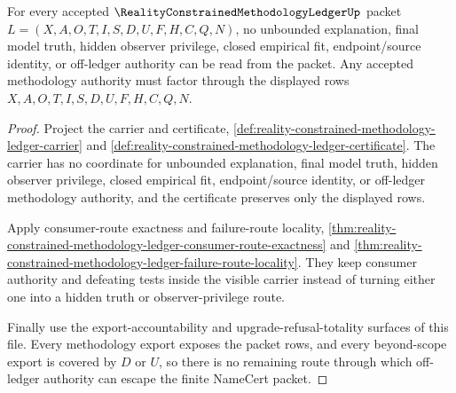 \begin{theorem}
\label{thm:reality-constrained-methodology-ledger-authority-nonescape}
For every accepted $\RealityConstrainedMethodologyLedgerUp$ packet
$L=(X,A,O,T,I,S,D,U,F,H,C,Q,N)$, no unbounded explanation, final model truth,
hidden observer privilege, closed empirical fit, endpoint/source identity, or
off-ledger authority can be read from the packet. Any accepted methodology
authority must factor through the displayed rows
$X,A,O,T,I,S,D,U,F,H,C,Q,N$.
\end{theorem}
\begin{proof}
Project the carrier and certificate,
\autoref{def:reality-constrained-methodology-ledger-carrier} and
\autoref{def:reality-constrained-methodology-ledger-certificate}. The carrier
has no coordinate for unbounded explanation, final model truth, hidden observer
privilege, closed empirical fit, endpoint/source identity, or off-ledger
methodology authority, and the certificate preserves only the displayed rows.

Apply consumer-route exactness and failure-route locality,
\autoref{thm:reality-constrained-methodology-ledger-consumer-route-exactness}
and
\autoref{thm:reality-constrained-methodology-ledger-failure-route-locality}.
They keep consumer authority and defeating tests inside the visible carrier
instead of turning either one into a hidden truth or observer-privilege route.

Finally use the export-accountability and upgrade-refusal-totality surfaces of
this file. Every methodology export exposes the packet rows, and every
beyond-scope export is covered by $D$ or $U$, so there is no remaining route
through which off-ledger authority can escape the finite NameCert packet.
\end{proof}
